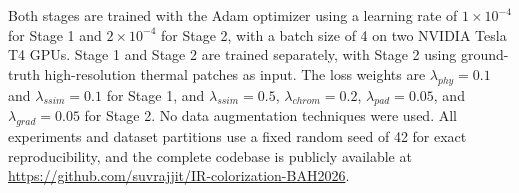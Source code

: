Both stages are trained with the Adam optimizer using a learning rate of $1 \times 10^{-4}$ for Stage 1 and $2 \times 10^{-4}$ for Stage 2, with a batch size of 4 on two NVIDIA Tesla T4 GPUs. Stage 1 and Stage 2 are trained separately, with Stage 2 using ground-truth high-resolution thermal patches as input. The loss weights are $\lambda_{phy} = 0.1$ and $\lambda_{ssim} = 0.1$ for Stage 1, and $\lambda_{ssim} = 0.5$, $\lambda_{chrom} = 0.2$, $\lambda_{pad} = 0.05$, and $\lambda_{grad} = 0.05$ for Stage 2. No data augmentation techniques were used. All experiments and dataset partitions use a fixed random seed of 42 for exact reproducibility, and the complete codebase is publicly available at \url{https://github.com/suvrajjit/IR-colorization-BAH2026}.
